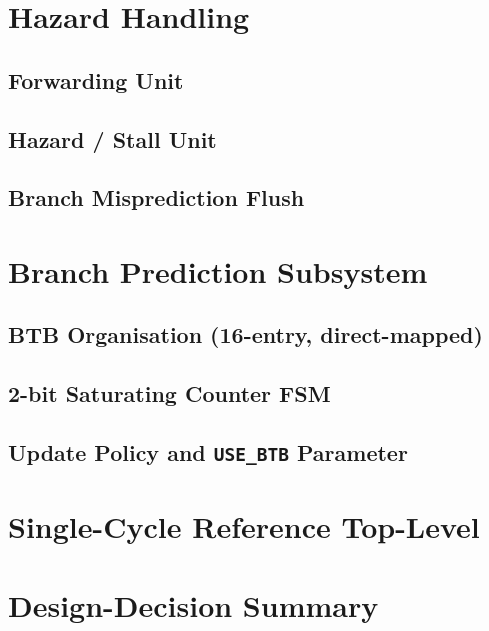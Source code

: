 \section{Hazard Handling}
\subsection{Forwarding Unit}
\subsection{Hazard / Stall Unit}
\subsection{Branch Misprediction Flush}

\section{Branch Prediction Subsystem}
\subsection{BTB Organisation (16-entry, direct-mapped)}
\subsection{2-bit Saturating Counter FSM}
\subsection{Update Policy and \texttt{USE\_BTB} Parameter}

\section{Single-Cycle Reference Top-Level}

\section{Design-Decision Summary}

